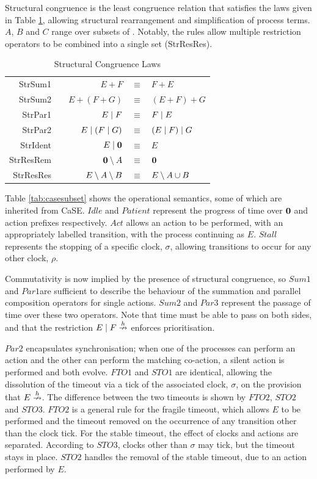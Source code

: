 Structural congruence is the least congruence relation that satisfies
the laws given in Table \ref{tab:structcong}, allowing structural
rearrangement and simplification of process terms. $A$, $B$ and $C$
range over subsets of \symbols.  Notably, the rules allow multiple
restriction operators to be combined into a single set (StrResRes).

\begin{table}
 \caption{Structural Congruence Laws}
 \label{tab:structcong}
  \shrule \centering
  \begin{tabular}{rcrcl}
  StrSum1 & \quad\quad &  
  $E + F$              & $\equiv$ & $F + E$
\\
  StrSum2 &&  
  $E + (F + G)$        & $\equiv$ & $(E + F) + G$
\\
  StrPar1 &&  
  $E \;|\; F$            & $\equiv$ & $F \;|\; E$
\\
  StrPar2 &&  
  $E \;|\; (F \;|\; G)$    & $\equiv$ & $(E \;|\; F) \;|\; G$
\\
  StrIdent &&  
  $E \;|\; \textbf{0}$         & $\equiv$ & $E$
\\
  StrResRem &&  
  $\textbf{0} \setminus {A}$       & $\equiv$ & $\textbf{0}$
\\
  StrResRes &&  
  $E \setminus {A} \setminus {B}$  & $\equiv$ & $E \setminus {A \cup B}$
  \end{tabular}
  \shrule
\end{table}

Table \ref{tab:casesubset} shows the operational semantics, some of
which are inherited from CaSE.  $Idle$ and $Patient$ represent
the progress of time over $\textbf{0}$ and action prefixes respectively.
$Act$ allows an action to be performed, with an appropriately labelled
transition, with the process continuing as $E$.  $Stall$ represents
the stopping of a specific clock, $\sigma$, allowing transitions to
occur for any other clock, $\rho$.

Commutativity is now implied by the presence of structural congruence,
so $Sum1$ and $Par1$are sufficient to describe the behaviour of the
summation and parallel composition operators for single actions.  $Sum2$
and $Par3$ represent the passage of time over these two operators.  Note
that time must be able to pass on both sides, and that the restriction
$E \mid F \stackrel{h}{\nrightarrow}$ enforces prioritisation.

$Par2$ encapsulates synchronisation; when one of the processes can
perform an action and the other can perform the matching co-action, a
silent action is performed and both evolve.  $FTO1$ and $STO1$ are
identical, allowing the dissolution of the timeout via a tick of the
associated clock, $\sigma$, on the provision that $E \stackrel{h}{\nrightarrow}$.
The difference between the two timeouts is shown by $FTO2$, $STO2$ and
$STO3$.  $FTO2$ is a general rule for the fragile timeout, which allows
$E$ to be performed and the timeout removed on the occurrence of any
transition other than the clock tick.  For the stable timeout, the
effect of clocks and actions are separated.  According to $STO3$, clocks
other than $\sigma$ may tick, but the timeout stays in place.  $STO2$
handles the removal of the stable timeout, due to an action performed by
$E$.


